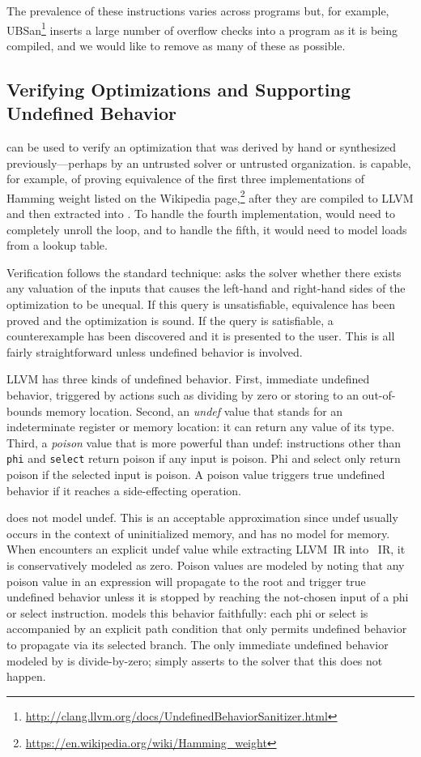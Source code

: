 The prevalence of these instructions varies across programs but, for
example,
UBSan\footnote{\url{http://clang.llvm.org/docs/UndefinedBehaviorSanitizer.html}}
inserts a large number of overflow checks into a program as it is
being compiled, and we would like to remove as many of these as
possible.


\subsection{Verifying Optimizations and Supporting Undefined Behavior}

\tool{} can be used to verify an optimization that was derived by hand
or synthesized previously---perhaps by an untrusted solver or
untrusted organization.
%
\tool{} is capable, for example, of proving equivalence of the first three
implementations of Hamming weight listed on the Wikipedia
page,\footnote{\url{https://en.wikipedia.org/wiki/Hamming_weight}} after they
are compiled to LLVM and then extracted into \tool{}.
%
To handle the fourth implementation, \tool{} would need to completely unroll the
loop, and to handle the fifth, it would need to model loads from a lookup table.



Verification follows the standard technique: \tool{} asks the solver
whether there exists any valuation of the inputs that causes
the left-hand and right-hand sides of the optimization to be unequal.
%
If this query is unsatisfiable, equivalence has been proved and
the optimization is sound.
%
If the query is satisfiable, a counterexample has been discovered and
it is presented to the user.
%
This is all fairly straightforward unless undefined behavior is
involved.


LLVM has three kinds of undefined behavior.
%
First, immediate undefined behavior, triggered by actions such as
dividing by zero or storing to an out-of-bounds memory location.
%
Second, an \emph{undef} value that stands for an indeterminate
register or memory location: it can return any value of its type.
%
Third, a \emph{poison} value that is more powerful than undef:
instructions other than \texttt{phi} and \texttt{select} return poison
if any input is poison.
%
Phi and select only return poison if the selected input is poison.
%
A poison value triggers true undefined behavior if it reaches a
side-effecting operation.


\tool{} does not model undef.
%
This is an acceptable approximation since undef usually occurs in the
context of uninitialized memory, and \tool{} has no model for memory.
%
When \tool{} encounters an explicit undef value while extracting
LLVM~IR into \tool{}~IR, it is conservatively modeled as zero.
%
Poison values are modeled by noting that any poison value in an \tool{}
expression will propagate to the root and trigger true undefined
behavior unless it is stopped by reaching the not-chosen input of a
phi or select instruction.
%
\tool{} models this behavior faithfully: each phi or select is
accompanied by an explicit path condition that only permits undefined
behavior to propagate via its selected branch.
%
The only immediate undefined behavior modeled by \tool{} is
divide-by-zero; \tool{} simply asserts to the solver that this does
not happen.



